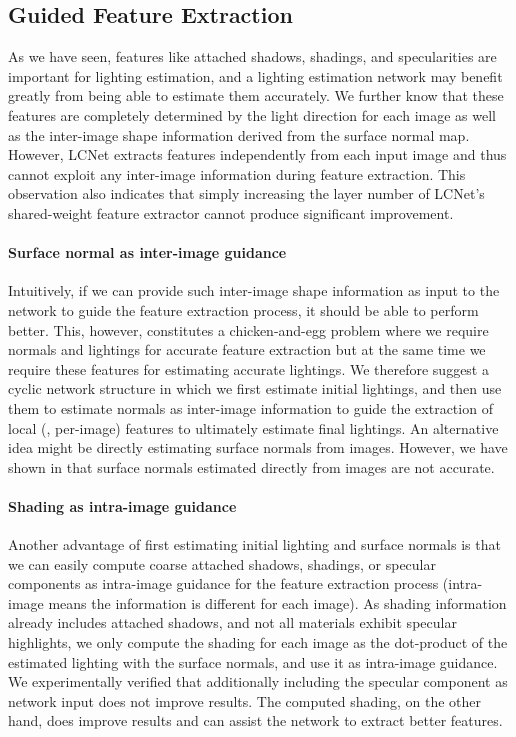 \subsection{Guided Feature Extraction}
\label{sec:guided_feature_extraction}
As we have seen, features like attached shadows, shadings, and specularities are important for lighting estimation, and a lighting estimation network may benefit greatly from being able to estimate them accurately. 
We further know that these features are completely determined by the light direction for each image as well as the inter-image shape information derived from the surface normal map.
However, LCNet extracts features independently from each input image and thus cannot exploit any inter-image information during feature extraction. This observation also indicates that simply increasing the layer number of LCNet's shared-weight feature extractor cannot %
produce significant improvement.

\paragraph{Surface normal as inter-image guidance}
Intuitively, if we can provide such inter-image shape information as input to the network to guide the feature extraction process, it should be able to perform better.
This, however, constitutes a chicken-and-egg problem where we require normals and lightings for accurate feature extraction but at the same time we require these features for estimating accurate lightings. We therefore suggest a cyclic network structure in which
we first estimate initial lightings, and then use them to estimate normals as inter-image information to guide the extraction of local (\ie, per-image) features to ultimately estimate final lightings. 
An alternative idea might be directly estimating surface normals from images. %
However, we have shown in  that surface normals estimated directly from images are not accurate.

\paragraph{Shading as intra-image guidance}
Another advantage of first estimating initial lighting and surface normals is that we can easily compute coarse attached shadows, shadings, or specular components as intra-image guidance for the feature extraction process (intra-image means the information is different %
for each image).
As shading information already includes attached shadows, and not all materials exhibit specular highlights, we only compute the shading for each image as the dot-product of the estimated lighting with the surface normals, and use it as intra-image guidance. 
We experimentally verified that additionally including the specular component as network input does not improve results.
The computed shading, on the other hand, does improve results and can assist the network to extract better features.

